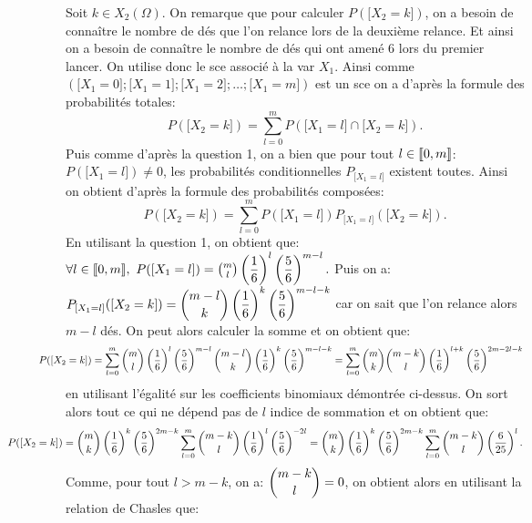 \documentclass[a4paper, 11pt,reqno]{article}
\begin{document}
\begin{correction}
\begin{enumerate}
\begin{itemize}
\begin{itemize}
						      \noindent Soit $k\in X_2(\Omega)$. On remarque que pour calculer $P(\lbrack X_2=k\rbrack)$, on a besoin de conna\^{i}tre le nombre de d\'es que l'on relance lors de la deuxi\`{e}me relance. Et ainsi on a besoin de conna\^{i}tre le nombre de d\'es qui ont amen\'e 6 lors du premier lancer. On utilise donc le sce associ\'e \`{a} la var $X_1$. Ainsi comme $(\lbrack X_1=0\rbrack;\lbrack X_1=1\rbrack;\lbrack X_1=2\rbrack;\dots;\lbrack X_1=m\rbrack )$ est un sce on a d'apr\`{e}s la formule des probabilit\'es totales:
						      $$P(\lbrack X_2=k\rbrack)=\sum\limits_{l=0}^m P(\lbrack X_1=l\rbrack\cap \lbrack X_2=k\rbrack).$$
						      Puis comme d'apr\`{e}s la question 1, on a bien que pour tout $l\in\llbracket  0,m\rrbracket$: $P(\lbrack X_1=l\rbrack)\not= 0$, les probabilit\'es conditionnelles $P_{\lbrack X_1=l\rbrack}$ existent toutes. Ainsi on obtient d'apr\`{e}s la formule des probabilit\'es compos\'ees:
						      $$P(\lbrack X_2=k\rbrack)=\sum\limits_{l=0}^m P(\lbrack X_1=l\rbrack)P_{\lbrack X_1=l\rbrack}(\lbrack X_2=k\rbrack).$$
						      En utilisant la question 1, on obtient que: $\forall l\in\llbracket  0,m\rrbracket,\ P(\lbrack X_1=l\rbrack)=\binom{m}{l}\left( \displaystyle\frac{1}{6} \right)^l\left( \displaystyle\frac{5}{6} \right)^{m-l}.$ Puis on a: $P_{\lbrack X_1=l\rbrack}(\lbrack X_2=k\rbrack)=\displaystyle\binom{m-l}{k}\left( \displaystyle\frac{1}{6} \right)^k\left( \displaystyle\frac{5}{6} \right)^{m-l-k} $ car on sait que l'on relance alors $m-l$ d\'es. On peut alors calculer la somme et on obtient que:
						      $$\hspace{-1cm} P(\lbrack X_2=k\rbrack)=\sum\limits_{l=0}^m \binom{m}{l}\left( \ddp\frac{1}{6} \right)^l\left( \ddp\frac{5}{6} \right)^{m-l}   \ddp\binom{m-l}{k}\left( \ddp\frac{1}{6} \right)^k\left( \ddp\frac{5}{6} \right)^{m-l-k}=\sum\limits_{l=0}^m \ddp \binom{m}{k}\ddp \binom{m-k}{l}  \left( \ddp\frac{1}{6} \right)^{l+k}\left( \ddp\frac{5}{6} \right)^{2m-2l-k} $$
						      en utilisant l'\'egalit\'e sur les coefficients binomiaux d\'emontr\'ee ci-dessus. On sort alors tout ce qui ne d\'epend pas de $l$ indice de sommation et on obtient que:
						      $$\hspace{-2cm} P(\lbrack X_2=k\rbrack)=\ddp \binom{m}{k} \left( \ddp\frac{1}{6} \right)^{k}\left( \ddp\frac{5}{6} \right)^{2m-k} \sum\limits_{l=0}^m  \ddp \binom{m-k}{l}  \left( \ddp\frac{1}{6} \right)^{l}\left( \ddp\frac{5}{6} \right)^{-2l}
							      =\ddp \binom{m}{k} \left( \ddp\frac{1}{6} \right)^{k}\left( \ddp\frac{5}{6} \right)^{2m-k} \sum\limits_{l=0}^m  \ddp \binom{m-k}{l}  \left( \ddp\frac{6}{25} \right)^{l}.$$
						      Comme, pour tout $l>m-k$, on a: $\displaystyle \binom{m-k}{l} =0$, on obtient alors en utilisant la relation de Chasles que:

\end{itemize}
\end{itemize}
\end{enumerate}
\end{correction}
\end{document}
